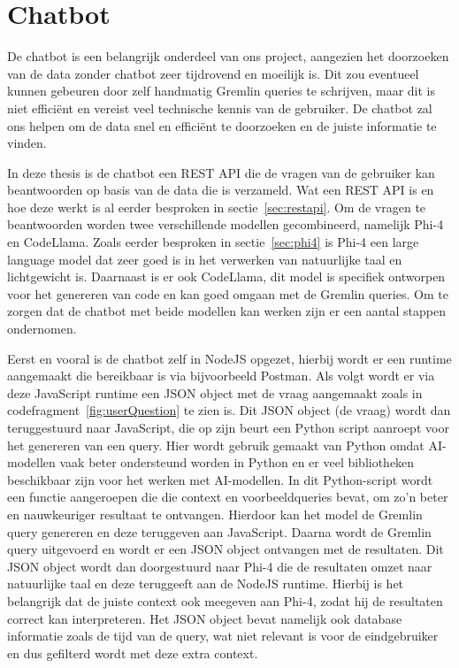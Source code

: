 \section{Chatbot}{\label{sec:chatbot}}
De chatbot is een belangrijk onderdeel van ons project, aangezien het doorzoeken van de data zonder chatbot zeer tijdrovend en moeilijk is.
Dit zou eventueel kunnen gebeuren door zelf handmatig Gremlin queries te schrijven, maar dit is niet efficiënt en vereist veel technische kennis van de gebruiker.
De chatbot zal ons helpen om de data snel en efficiënt te doorzoeken en de juiste informatie te vinden.

In deze thesis is de chatbot een REST API die de vragen van de gebruiker kan beantwoorden op basis van de data die is verzameld.
Wat een REST API is en hoe deze werkt is al eerder besproken in sectie~\ref{sec:restapi}.
Om de vragen te beantwoorden worden twee verschillende modellen gecombineerd, namelijk Phi-4 en CodeLlama. 
Zoals eerder besproken in sectie~\ref{sec:phi4} is Phi-4 een large language model dat zeer goed is in het verwerken van natuurlijke taal en lichtgewicht is.
Daarnaast is er ook CodeLlama, dit model is specifiek ontworpen voor het genereren van code en kan goed omgaan met de Gremlin queries.
Om te zorgen dat de chatbot met beide modellen kan werken zijn er een aantal stappen ondernomen.

Eerst en vooral is de chatbot zelf in NodeJS opgezet, hierbij wordt er een runtime aangemaakt die bereikbaar is via bijvoorbeeld Postman.
Als volgt wordt er via deze JavaScript runtime een JSON object met de vraag aangemaakt zoals in codefragment~\ref{fig:userQuestion} te zien is.
Dit JSON object (de vraag) wordt dan teruggestuurd naar JavaScript, die op zijn beurt een Python script aanroept voor het genereren van een query.
Hier wordt gebruik gemaakt van Python omdat AI-modellen vaak beter ondersteund worden in Python en er veel bibliotheken beschikbaar zijn voor het werken met AI-modellen.
In dit Python-script wordt een functie aangeroepen die die context en voorbeeldqueries bevat, om zo'n beter en nauwkeuriger resultaat te ontvangen.
Hierdoor kan het model de Gremlin query genereren en deze teruggeven aan JavaScript.
Daarna wordt de Gremlin query uitgevoerd en wordt er een JSON object ontvangen met de resultaten.
Dit JSON object wordt dan doorgestuurd naar Phi-4 die de resultaten omzet naar natuurlijke taal en deze teruggeeft aan de NodeJS runtime.
Hierbij is het belangrijk dat de juiste context ook meegeven aan Phi-4, zodat hij de resultaten correct kan interpreteren.
Het JSON object bevat namelijk ook database informatie zoals de tijd van de query, wat niet relevant is voor de eindgebruiker en dus gefilterd wordt met deze extra context.

